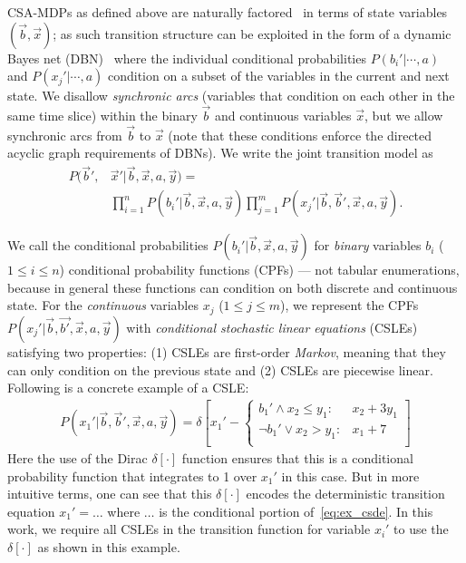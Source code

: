 CSA-MDPs as defined above are naturally factored~\cite{boutilier99dt}
in terms of state variables $(\vec{b},\vec{x})$; as such transition
structure can be exploited in the form of a dynamic Bayes net
(DBN)~\cite{dbn} where the individual conditional probabilities
$P(b_i'|\cdots,a)$ and $P(x_j'|\cdots,a)$ condition on a subset of the
variables in the current and next state.  We disallow \emph{synchronic
arcs} (variables that condition on each other in the same time slice) 
within the binary $\vec{b}$ and continuous variables $\vec{x}$, 
but we allow synchronic arcs from $\vec{b}$ to $\vec{x}$ (note that
these conditions enforce the directed acyclic graph requirements of
DBNs).
We write the joint transition model as
\begin{align}
P(\vec{b}',&\vec{x}'|\vec{b},\vec{x},a,\vec{y}) = \label{eq:dbn} \\
& \prod_{i=1}^n P(b_i'|\vec{b},\vec{x},a,\vec{y}) \prod_{j=1}^m P(x_j'|\vec{b},\vec{b}',\vec{x},a,\vec{y}). \nonumber 
\end{align}

We call the conditional probabilities
$P(b_i'|\vec{b},\vec{x},a,\vec{y})$ for \emph{binary} variables $b_i$
($1 \leq i \leq n$) conditional probability functions (CPFs) --- not
tabular enumerations, because in general these functions can condition
on both discrete and continuous state.  For the \emph{continuous}
variables $x_j$ ($1 \leq j \leq m$), we represent the CPFs
$P(x_j'|\vec{b},\vec{b'},\vec{x},a,\vec{y})$ with \emph{conditional
stochastic linear equations} (CSLEs) satisfying two properties: (1) CSLEs are
first-order \emph{Markov}, meaning that they can only condition on the previous
state and (2) CSLEs are piecewise linear.  Following is 
a concrete example of a CSLE:
{\footnotesize
\begin{align}
P(x_1' | \vec{b},\vec{b}',\vec{x},a,\vec{y}) = \delta\left[ x_1' - 
\begin{cases}
b_1' \land x_2 \leq y_1  : & x_2 + 3y_1 \\
\neg b_1' \lor x_2 > y_1 : & x_1 + 7\\
\end{cases}
\right] \label{eq:ex_csde}
\end{align}}
Here 
the use of the Dirac $\delta[\cdot]$ function ensures that this is a
conditional probability function that integrates to 1 over $x_1'$
in this case.  But in more intuitive terms, one can see that this
$\delta[\cdot]$ encodes the deterministic transition 
equation $x_1' = \ldots$ where $\ldots$ is the conditional portion 
of~\eqref{eq:ex_csde}.
In this work, we require all CSLEs in the transition
function for variable $x_i'$ to use the $\delta[\cdot]$ as shown in this
example.

